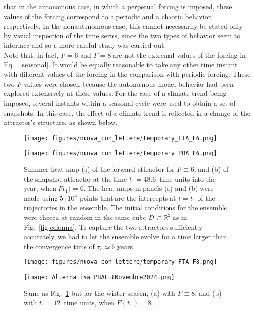 \documentclass[%
 aip, cha,
 amsmath,amssymb,
 reprint,%
author-year,%
]{revtex4-1}
\newcommand{\0}{\mathbf 0}
\begin{document}
that in the autonomous case, in which a perpetual forcing is imposed, these values of the forcing correspond to a periodic and a chaotic behavior, respectively. In the nonautonomous case, this cannot necessarily be stated only by visual inspection of the time series, since the two types of behavior seem to interlace and so a more careful study was carried out. \\
Note that, in fact, $F=6$ and $F=8$ are not the extremal values of the forcing in Eq.~ \eqref{seasonal}. It would be equally reasonable to take any other time instant with different values of the forcing in the comparison with periodic forcing. These two $F$ values were chosen because the autonomous model behavior had been explored extensively at these values.
For the case of a climate trend being imposed, several instants within a seasonal cycle were used to obtain a set of snapshots. In this case, the effect of a climate trend is reflected in a change of the attractor's structure, as shown below. \\
\begin{figure*}
  \begin{minipage}{0.45\textwidth}
    \centering
    \texttt{[image: figures/nuova\_con\_lettere/temporary\_FTA\_F6.png]}
  \end{minipage}%
  \begin{minipage}{0.45\textwidth}
    \centering
    \texttt{[image: figures/nuova\_con\_lettere/temporary\_PBA\_F6.png]}
  \end{minipage}
   \caption{Summer heat map (a) of the forward attractor for $F \equiv 6$; and (b) of the snapshot attractor at the time ${t}_1=48.6$~time units into the year, when $F{t}_1) = 6$. The heat maps in panels (a) and (b) were made using $5 \cdot 10^4$ points that are the intercepts at $t = t_1$ of the trajectories in the ensemble. The initial conditions for the ensemble were chosen at random in the same cube $D \subset \mathbb R^3$ as in Fig.~\ref{fig:colonna}. To capture the two attractors sufficiently accurately, we had to let the ensemble evolve for a time larger than the convergence time of $\tau_c \simeq 5$ years.}
   \label{fig:PBA_F6}
\end{figure*}
\begin{figure*}
  \begin{minipage}{0.45\textwidth}
    \centering
    \texttt{[image: figures/nuova\_con\_lettere/temporary\_FTA\_F8.png]}
  \end{minipage}%
  \begin{minipage}{0.45\textwidth}
    \centering
    \texttt{[image: Alternativa\_PBAF=8Novembre2024.png]}
    
  \end{minipage}
\caption{Same as Fig.~\ref{fig:PBA_F6}  but for the winter season, (a) with $F \equiv 8$; and (b) with ${t}_1=12$~time units, when $F({t}_1)=8$. }
  \label{fig:PBA_F8} 
\end{figure*}
\end{document}
